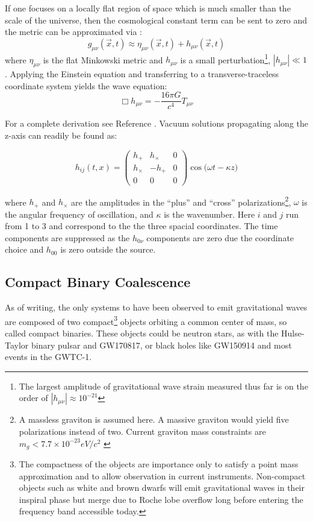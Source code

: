 \documentclass [12pt, proquest]{uwthesis}[2019]
\begin{document}
If one focuses on a locally flat region of space which is much smaller than the scale of the universe, then the cosmological constant term can be sent to zero and the metric can be approximated via \cite{GW}:
\begin{equation}
g_{\mu \nu}(\vec x,t)\approx\eta_{\mu \nu}(\vec x,t)+h_{\mu \nu}(\vec x,t)
\end{equation}
where $\eta_{\mu \nu}$ is the flat Minkowski metric and $h_{\mu \nu}$ is a small perturbation\footnote{The largest amplitude of gravitational wave strain measured thus far is on the order of $|h_{\mu \nu}|\approx 10^{-21}$\cite{GW150914}}, $|h_{\mu \nu}|\ll 1$. Applying the Einstein equation and transferring to a transverse-traceless coordinate system yields the wave equation:
\begin{equation}
\Box h_{\mu \nu}=-\frac{16 \pi G}{c^4}T_{\mu \nu}
\end{equation}

For a complete derivation see Reference \cite{GWbook}. Vacuum solutions propagating along the z-axis can readily be found as:

\begin{equation}
h_{ij}(t,x)=\begin{pmatrix} h_+ & h_\times & 0 \\ h_\times & -h_+ & 0 \\ 0 & 0 & 0\end{pmatrix} \cos\big(\omega t - \kappa z)
\end{equation}

where $h_+$ and $h_\times$ are the amplitudes in the ``plus'' and ``cross'' polarizations\footnote{A massless graviton is assumed here. A massive graviton would yield five polarizations instead of two. Current graviton mass constraints are $m_g< 7.7\times 10^{-23} eV/c^2$ \cite{some}}, $\omega$ is the angular frequency of oscillation, and $\kappa$ is the wavenumber. Here $i$ and $j$ run from 1 to 3 and correspond to the the three spacial coordinates. The time components are suppressed as the $h_{0\nu}$ components are zero due the coordinate choice and $h_{00}$ is zero outside the source. 

\subsection{Compact Binary Coalescence}\label{CBC}

As of writing, the only systems to have been observed to emit gravitational waves are composed of two compact\footnote{The compactness of the objects are importance only to satisfy a point mass approximation and to allow observation in current instruments. Non-compact objects such as white and brown dwarfs will emit gravitational waves in their inspiral phase but merge due to Roche lobe overflow long before entering the frequency band accessible today.} objects orbiting a common center of mass, so called compact binaries. These objects could be neutron stars, as with the Hulse-Taylor binary pulsar\cite{hulseTaylor} and GW170817\cite{GW170817}, or black holes like GW150914\cite{GW150914} and most events in the GWTC-1\cite{GWTC-1}.
\end{document}
